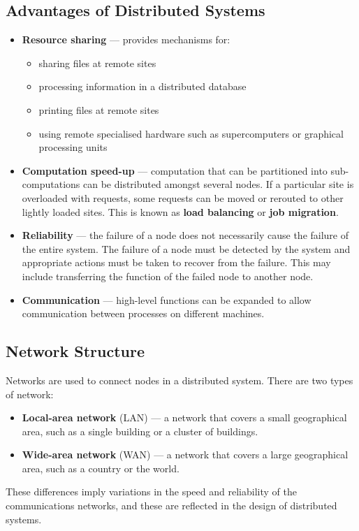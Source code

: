 \documentclass{article}
\begin{document}
\subsection{Advantages of Distributed Systems}
\begin{itemize}
    \item \textbf{Resource sharing} --- provides mechanisms for:
          \begin{itemize}
              \item sharing files at remote sites
              \item processing information in a distributed database
              \item printing files at remote sites
              \item using remote specialised hardware such as
                    supercomputers or graphical processing units
          \end{itemize}
    \item \textbf{Computation speed-up} --- computation that can be
          partitioned into sub-computations can be distributed amongst several
          nodes. If a particular site is overloaded with requests, some
          requests can be moved or rerouted to other lightly loaded sites.
          This is known as \textbf{load balancing} or \textbf{job migration}.
    \item \textbf{Reliability} --- the failure of a node does not
          necessarily cause the failure of the entire system. The
          failure of a node must be detected by the system and
          appropriate actions must be taken to recover from the failure.
          This may include transferring the function of the failed node
          to another node.
    \item \textbf{Communication} --- high-level functions can be
          expanded to allow communication between processes on different
          machines.
\end{itemize}
\subsection{Network Structure}
Networks are used to connect nodes in a distributed system. There are
two types of network:
\begin{itemize}
    \item \textbf{Local-area network} (LAN) --- a network that covers
          a small geographical area, such as a single building or a
          cluster of buildings.
    \item \textbf{Wide-area network} (WAN) --- a network that covers
          a large geographical area, such as a country or the world.
\end{itemize}
These differences imply variations in the speed and reliability of the
communications networks, and these are reflected in the design of
distributed systems.
\end{document}

